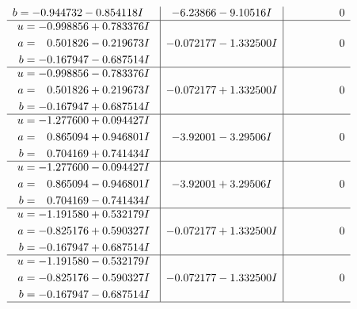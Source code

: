 \documentclass[1p]{elsarticle_modified}
\theoremstyle{definition}
\begin{document}
$$\begin{array}{c|c|c}
\begin{aligned}
b &= -0.944732 - 0.854118 I\end{aligned}
 & -6.23866 - 9.10516 I & \phantom{-0.000000 } 0 \\ \hline\begin{aligned}
u &= -0.998856 + 0.783376 I \\
a &= \phantom{-}0.501826 - 0.219673 I \\
b &= -0.167947 - 0.687514 I\end{aligned}
 & -0.072177 - 1.332500 I & \phantom{-0.000000 } 0 \\ \hline\begin{aligned}
u &= -0.998856 - 0.783376 I \\
a &= \phantom{-}0.501826 + 0.219673 I \\
b &= -0.167947 + 0.687514 I\end{aligned}
 & -0.072177 + 1.332500 I & \phantom{-0.000000 } 0 \\ \hline\begin{aligned}
u &= -1.277600 + 0.094427 I \\
a &= \phantom{-}0.865094 + 0.946801 I \\
b &= \phantom{-}0.704169 + 0.741434 I\end{aligned}
 & -3.92001 - 3.29506 I & \phantom{-0.000000 } 0 \\ \hline\begin{aligned}
u &= -1.277600 - 0.094427 I \\
a &= \phantom{-}0.865094 - 0.946801 I \\
b &= \phantom{-}0.704169 - 0.741434 I\end{aligned}
 & -3.92001 + 3.29506 I & \phantom{-0.000000 } 0 \\ \hline\begin{aligned}
u &= -1.191580 + 0.532179 I \\
a &= -0.825176 + 0.590327 I \\
b &= -0.167947 + 0.687514 I\end{aligned}
 & -0.072177 + 1.332500 I & \phantom{-0.000000 } 0 \\ \hline\begin{aligned}
u &= -1.191580 - 0.532179 I \\
a &= -0.825176 - 0.590327 I \\
b &= -0.167947 - 0.687514 I\end{aligned}
 & -0.072177 - 1.332500 I & \phantom{-0.000000 } 0\\
 \hline 
 \end{array}$$\newpage$$\begin{array}{c|c|c}  

\end{array}$$
\end{document}
